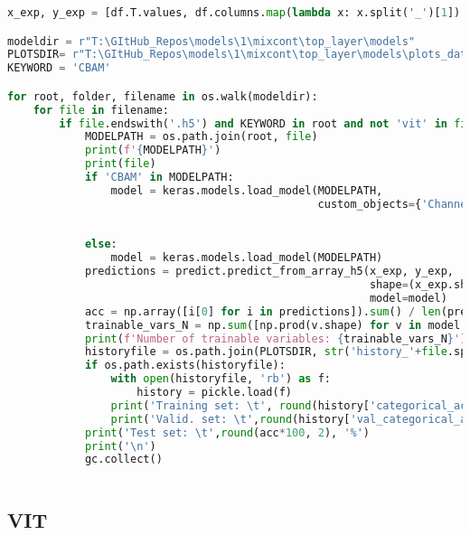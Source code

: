 \begin{lstlisting}[language=Python]
x_exp, y_exp = [df.T.values, df.columns.map(lambda x: x.split('_')[1]).values] # top layer

modeldir = r"T:\GItHub_Repos\models\1\mixcont\top_layer\models"
PLOTSDIR= r"T:\GItHub_Repos\models\1\mixcont\top_layer\models\plots_data"
KEYWORD = 'CBAM'

for root, folder, filename in os.walk(modeldir):
    for file in filename:
        if file.endswith('.h5') and KEYWORD in root and not 'vit' in file:
            MODELPATH = os.path.join(root, file)
            print(f'{MODELPATH}')
            print(file)
            if 'CBAM' in MODELPATH:
                model = keras.models.load_model(MODELPATH,
                                                custom_objects={'ChannelAttention': ChannelAttention,
                                                                           'SpatialAttention': SpatialAttention,
                                                                           'CBAM': functions_tf.CBAM})
            else:
                model = keras.models.load_model(MODELPATH)
            predictions = predict.predict_from_array_h5(x_exp, y_exp,
                                                        shape=(x_exp.shape[0], 1,1024),
                                                        model=model)
            acc = np.array([i[0] for i in predictions]).sum() / len(predictions)
            trainable_vars_N = np.sum([np.prod(v.shape) for v in model.trainable_variables])
            print(f'Number of trainable variables: {trainable_vars_N}')
            historyfile = os.path.join(PLOTSDIR, str('history_'+file.split('.')[0]+'.pkl'))
            if os.path.exists(historyfile):
                with open(historyfile, 'rb') as f:
                    history = pickle.load(f)
                print('Training set: \t', round(history['categorical_accuracy'][-1]*100, 2), '%')
                print('Valid. set: \t',round(history['val_categorical_accuracy'][-1]*100, 2), '%')
            print('Test set: \t',round(acc*100, 2), '%')
            print('\n')
            gc.collect()
            
\end{lstlisting}


\hypertarget{vit}{%
\subsection*{VIT}\label{vit}}

